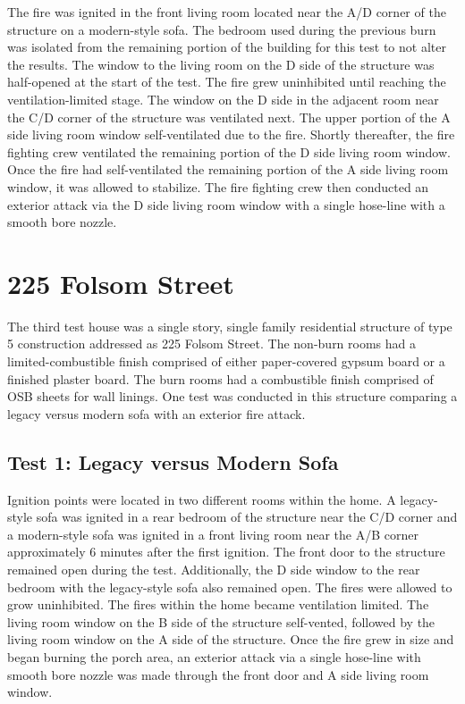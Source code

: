 \documentclass{article}
\begin{document}
The fire was ignited in the front living room located near the A/D corner of the structure on a modern-style sofa. The bedroom used during the previous burn was isolated from the remaining portion of the building for this test to not alter the results. The window to the living room on the D side of the structure was half-opened at the start of the test. The fire grew uninhibited until reaching the ventilation-limited stage. The window on the D side in the adjacent room near the C/D corner of the structure was ventilated next.  The upper portion of the A side living room window self-ventilated due to the fire.  Shortly thereafter, the fire fighting crew ventilated the remaining portion of the D side living room window. Once the fire had self-ventilated the remaining portion of the A side living room window, it was allowed to stabilize.  The fire fighting crew then conducted an exterior attack via the D side living room window with a single hose-line with a smooth bore nozzle. 

\section{225 Folsom Street}

 The third test house was a single story, single family residential structure of type 5 construction addressed as 225 Folsom Street. The non-burn rooms had a limited-combustible finish comprised of either paper-covered gypsum board or a finished plaster board.  The burn rooms had a combustible finish comprised of OSB sheets for wall linings.  One test was conducted in this structure comparing a legacy versus modern sofa with an exterior fire attack.
 
 \subsection{Test 1: Legacy versus Modern Sofa}
 
  Ignition points were located in two different rooms within the home. A legacy-style sofa was ignited in a rear bedroom of the structure near the C/D corner and a modern-style sofa was ignited in a front living room near the A/B corner approximately 6 minutes after the first ignition.  The front door to the structure remained open during the test. Additionally, the D side window to the rear bedroom with the legacy-style sofa also remained open.  The fires were allowed to grow uninhibited. The fires within the home became ventilation limited.  The living room window on the B side of the structure self-vented, followed by the living room window on the A side of the structure. Once the fire grew in size and began burning the porch area, an exterior attack via a single hose-line with smooth bore nozzle was made through the front door and A side living room window.
  
      
\end{document}
